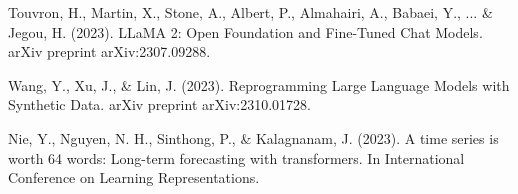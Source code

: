 \begin{thebibliography}{99}
	 Touvron, H., Martin, X., Stone, A., Albert, P., Almahairi, A., Babaei, Y., ... \& Jegou, H. (2023). LLaMA 2: Open Foundation and Fine-Tuned Chat Models. arXiv preprint arXiv:2307.09288.

	 Wang, Y., Xu, J., \& Lin, J. (2023). Reprogramming Large Language Models with Synthetic Data. arXiv preprint arXiv:2310.01728.

	 Nie, Y., Nguyen, N. H., Sinthong, P., \& Kalagnanam, J. (2023). A time series is worth 64 words: Long-term forecasting with transformers. In International Conference on Learning Representations.

\end{thebibliography}
